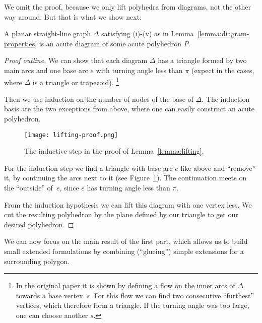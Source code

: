 We omit the proof, because we only lift polyhedra from diagrams, not the other way around. But that is what we show next:

\begin{lemma}\label{lemma:lifting}
  A planar straight-line graph $\Delta$ satisfying (i)-(v) as in Lemma~\ref{lemma:diagram-properties} is an acute diagram of some acute polyhedron $P$.
\end{lemma}

\begin{proof}[Proof outline]
  We can show that each diagram $\Delta$ has a triangle formed by two main arcs and one base arc $e$ with turning angle less than $\pi$ (expect in the cases, where $\Delta$ is a triangle or trapezoid). \footnote{In the original paper it is shown by defining a flow on the inner arcs of $\Delta$ towards a base vertex~$s$. For this flow we can find two consecutive ``furthest'' vertices, which therefore form a triangle. If the turning angle was too large, one can choose another $s$.}

  Then we use induction on the number of nodes of the base of $\Delta$. The induction basis are the two exceptions from above, where one can easily construct an acute polyhedron.

  \begin{figure}[h]
    \centering
    \texttt{[image: lifting-proof.png]}
    \caption{The inductive step in the proof of Lemma~\ref{lemma:lifting}. \cite[Figure 2]{shitov2020sublinear}}
    \label{fig:lifting-proof}
  \end{figure}

  For the induction step we find a triangle with base arc $e$ like above and ``remove'' it, by continuing the arcs next to it (see Figure~\ref{fig:lifting-proof}). The continuation meets on the ``outside'' of~$e$, since $e$ has turning angle less than $\pi$. 

  From the induction hypothesis we can lift this diagram with one vertex less. We cut the resulting polyhedron by the plane defined by our triangle to get our desired polyhedron.
\end{proof}

We can now focus on the main result of the first part, which allows us to build small extended formulations by combining (``glueing'') simple extensions for a surrounding polygon.

